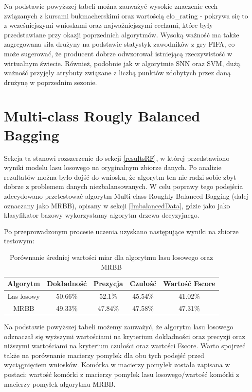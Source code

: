 Na podstawie powyższej tabeli można zauważyć wysokie znaczenie cech związanych z kursami bukmacherskimi oraz wartością elo\_rating - pokrywa się to z wcześniejszymi wnioskami oraz najważniejszymi cechami, które były przedstawiane przy okazji poprzednich algorytmów. Wysoką ważność ma także zagregowana siła drużyny na podstawie statystyk zawodników z gry FIFA, co może sugerować, że producent dobrze odwzorował istniejącą rzeczywistość w wirtualnym świecie. Również, podobnie jak w algorytmie SNN oraz SVM, dużą ważność przyjęły atrybuty związane z liczbą punktów zdobytych przez daną drużynę w poprzednim sezonie.

\section{Multi-class Rougly Balanced Bagging}
\noindent Sekcja ta stanowi rozszerzenie do sekcji \ref{resultsRF}, w której przedstawiono wyniki modelu lasu losowego na oryginalnym zbiorze danych. Po analizie rezultatów można było dojść do wniosku, że algorytm ten nie radzi sobie zbyt dobrze z problemem danych niezbalansowanych. W celu poprawy tego podejścia zdecydowano przetestować algorytm Multi-class Roughly Balanced Bagging (dalej oznaczany jako MRBB), opisany w sekcji \ref{ImbalancedData}, gdzie jako jako klasyfikator bazowy wykorzystamy algorytm drzewa decyzyjnego.

Po przeprowadzonym procesie uczenia uzyskano następujące wyniki na zbiorze testowym:

\begin{table}[H]
    \centering
    \caption{Porównanie średniej wartości miar dla algorytmu lasu losowego oraz MRBB}
    \begin{tabular}{| c | c | c | c | c |}
    \hline
        Algorytm & Dokładność & Prezycja & Czułość & Wartość Fscore \\ \hline 
        \hline
        Las losowy & 50.66\% & 52.1\% & 45.54\% & 41.02\% \\
        \hline
        MRBB & 49.33\% & 47.84\% & 47.58\% & 47.31\% \\
        \hline
    \end{tabular}
\end{table}

Na podstawie powyższej tabeli możemy zauważyć, że algorytm lasu losowego odznaczał się wyższymi wartościami na kryterium dokładności oraz precyzji oraz niższymi wartościami na kryterium czułości oraz wartości Fscore. Warto spojrzeć także na porównanie macierzy pomyłek dla obu tych podejść przed wyciągnięciem wniosków. Komórka w macierzy pomyłek została zapisana w postaci: wartość komórki z macierzy pomyłek lasu losowego/wartość komórki z macierzy pomyłek algorytmu MRBB.

